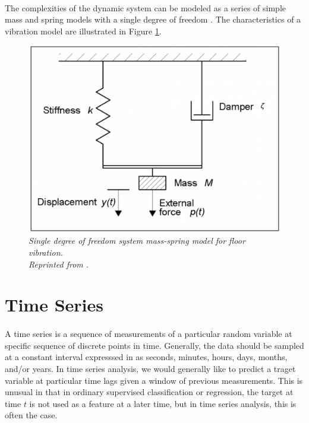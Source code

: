 \paragraph{}
The complexities of the dynamic system can be modeled as a series of simple mass and spring models with a single degree of freedom \cite{p_gavin_2015}. The characteristics of a vibration model are illustrated in Figure \ref{fig:s_degree}.

\begin{figure}[H]
  \centering
  \caption[Single degree of freedom system mass-spring model for floor vibration.]{\emph{Single degree of freedom system mass-spring model for floor vibration. \\ Reprinted from \citeauthor{steelconstruction_2016} \citeyear{steelconstruction_2016}.}  }\label{fig:s_degree}
  \includegraphics[scale = 0.13]{figures/single_degree.jpg}  
\end{figure}

\section{Time Series}
\paragraph{}
A time series is a sequence of measurements of a particular random variable at specific sequence of discrete points in time. Generally, the data should be sampled at a constant interval expresssed in as seconds, minutes, hours, days, months, and/or years. In time series analysis, we would generally like to predict a traget variable at particular time lags given a window of previous measurements. This is unusual in that in ordinary supervised classification or regression, the target at time $t$ is not used as a feature at a later time, but in time series analysis, this is often the case. 


